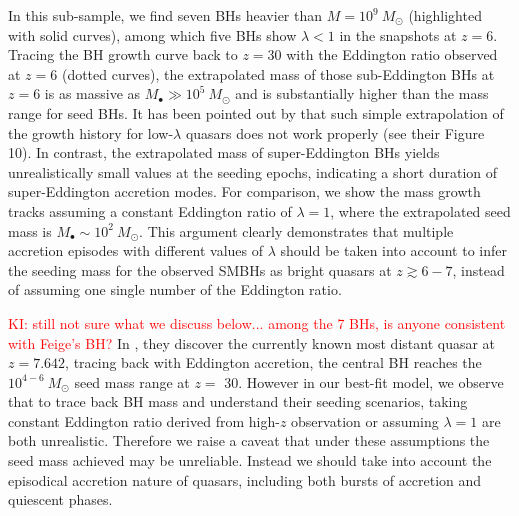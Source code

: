 \documentclass[twocolumn, twocolappendix]{aastex63}
\newcommand{\Msun}{M_\odot}
\newcommand{\Mbh}{M_\bullet}
\newcommand{\tlife}{\tau}
\newcommand{\red}[1]{\textcolor{red}{ #1}}
\begin{document}
\begin{CJK*}{UTF8}{gbsn}
In this sub-sample, we find seven BHs heavier than $M=10^9~\Msun$ (highlighted with solid curves), 
among which five BHs show $\lambda<1$ in the snapshots at $z=6$.
Tracing the BH growth curve back to $z=30$ with the Eddington ratio observed at $z=6$ (dotted curves),
the extrapolated mass of those sub-Eddington BHs at $z=6$ is as massive as $\Mbh \gg 10^5~\Msun$ and is 
substantially higher than the mass range for seed BHs.
%
It has been pointed out by \cite{2019ApJ...880...77O} that such simple extrapolation of the growth history for low-$\lambda$ quasars 
does not work properly (see their Figure 10).
%
In contrast, the extrapolated mass of super-Eddington BHs yields unrealistically small values at the seeding epochs,
indicating a short duration of super-Eddington accretion modes.
For comparison, we show the mass growth tracks assuming a constant Eddington ratio of $\lambda=1$, 
where the extrapolated seed mass is $\Mbh \sim 10^2~\Msun$.
This argument clearly demonstrates that multiple accretion episodes with different values of $\lambda$ should be taken into account 
to infer the seeding mass for the observed SMBHs as bright quasars at $z\gtrsim 6-7$, instead of assuming one single number 
of the Eddington ratio.


\red{KI: still not sure what we discuss below... among the 7 BHs, is anyone consistent with Feige's BH?}
In \citet{2021ApJ...907L...1W}, they discover the currently known most distant quasar at $z=7.642$, 
tracing back with Eddington accretion, the central BH reaches the $10^{4-6}~\Msun$ seed mass range at $z=$ 30. 
However in our best-fit model, we observe that to trace back BH mass and understand their seeding scenarios, 
taking constant Eddington ratio derived from high-$z$ observation or assuming $\lambda=1$ are both unrealistic. 
Therefore we raise a caveat that under these assumptions the seed mass achieved may be unreliable. 
Instead we should take into account the episodical accretion nature of quasars, 
including both bursts of accretion and quiescent phases.


\end{CJK*}
\end{document}
